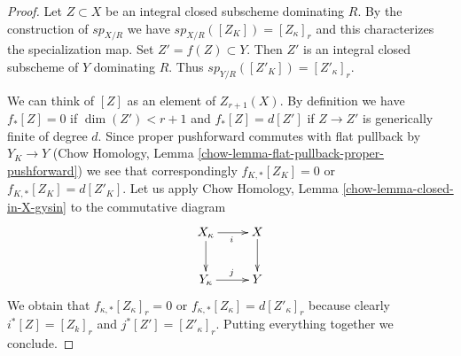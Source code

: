 \documentclass{stacks-project}
\theoremstyle{plain}
\theoremstyle{definition}
\theoremstyle{remark}
\numberwithin{equation}{subsection}
\begin{document}
\begin{proof}
Let $Z \subset X$ be an integral closed subscheme dominating $R$.
By the construction of $sp_{X/R}$ we have $sp_{X/R}([Z_K]) = [Z_\kappa]_r$
and this characterizes the specialization map.
Set $Z' = f(Z) \subset Y$. Then $Z'$ is an integral closed subscheme
of $Y$ dominating $R$. Thus $sp_{Y/R}([Z'_K]) = [Z'_\kappa]_r$.

\medskip\noindent
We can think of $[Z]$ as an element of $Z_{r + 1}(X)$. By definition
we have $f_*[Z] = 0$ if $\dim(Z') < r + 1$ and $f_*[Z] = d[Z']$
if $Z \to Z'$ is generically finite of degree $d$.
Since proper pushforward commutes with flat pullback by $Y_K \to Y$
(Chow Homology, Lemma \ref{chow-lemma-flat-pullback-proper-pushforward})
we see that correspondingly $f_{K, *}[Z_K] = 0$ or $f_{K, *}[Z_K] = d[Z'_K]$.
Let us apply Chow Homology, Lemma \ref{chow-lemma-closed-in-X-gysin} to
the commutative diagram
$$
\xymatrix{
X_\kappa \ar[d] \ar[r]_i & X \ar[d] \\
Y_\kappa \ar[r]^j & Y
}
$$
We obtain that $f_{\kappa, *}[Z_\kappa]_r = 0$ or
$f_{\kappa, *}[Z_\kappa] = d[Z'_\kappa]_r$ because
clearly $i^*[Z] = [Z_k]_r$ and $j^*[Z'] = [Z'_\kappa]_r$.
Putting everything together we conclude.
\end{proof}
\end{document}

